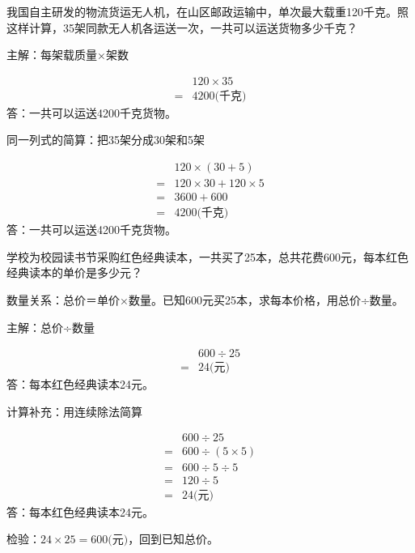 我国自主研发的物流货运无人机，在山区邮政运输中，单次最大载重120千克。照这样计算，35架同款无人机各运送一次，一共可以运送货物多少千克？\par
\begin{BookAnswer}
主解：每架载质量×架数\par \[\begin{aligned} &120\times35\\={}&4200\text{(千克)}\end{aligned}\]答：一共可以运送4200千克货物。\par 同一列式的简算：把35架分成30架和5架\par \[\begin{aligned} &120\times(30+5)\\={}&120\times30+120\times5\\={}&3600+600\\={}&4200\text{(千克)}\end{aligned}\]答：一共可以运送4200千克货物。\par
\end{BookAnswer}

学校为校园读书节采购红色经典读本，一共买了25本，总共花费600元，每本红色经典读本的单价是多少元？\par
\begin{BookAnswer}
数量关系：总价＝单价×数量。已知600元买25本，求每本价格，用总价÷数量。\par 主解：总价÷数量\par \[\begin{aligned} &600\div25\\={}&24\text{(元)}\end{aligned}\]答：每本红色经典读本24元。\par 计算补充：用连续除法简算\par \[\begin{aligned} &600\div25\\={}&600\div(5\times5)\\={}&600\div5\div5\\={}&120\div5\\={}&24\text{(元)}\end{aligned}\]答：每本红色经典读本24元。\par 检验：\(24\times25=600\text{(元)}\)，回到已知总价。
\end{BookAnswer}



